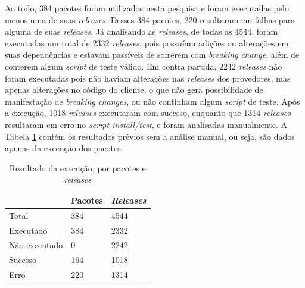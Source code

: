 
Ao todo, 384 pacotes foram utilizados nesta pesquisa e foram executadas pelo menos uma de suas \textit{releases}. Desses 384 pacotes, 220 resultaram em falhas para alguma de suas \textit{releases}. Já analisando as \textit{releases}, de todas as 4544, foram executadas um total de 2332 \textit{releases}, pois possuíam adições ou alterações em suas dependências e estavam passíveis de sofrerem com \textit{breaking change}, além de conterem algum \textit{script} de teste válido. Em contra partida, 2242 \textit{releases} não foram executadas pois não haviam alterações nas \textit{releases} dos provedores, mas apenas alterações no código do cliente, o que não gera possibilidade de manifestação de \textit{breaking changes}, ou não continham algum \textit{script} de teste. Após a execução, 1018 \textit{releases} executaram com sucesso, enquanto que 1314 \textit{releases} resultaram em erro no \textit{script install/test}, e foram analisadas manualmente. A Tabela \ref{tab:res_rq1_1} contém os resultados prévios sem a análise manual, ou seja, são dados apenas da execução dos pacotes.

\begin{table}[]
\centering
\begin{tabular}{|l|l|l|}
\hline
                    & Pacotes & \textit{Releases} \\ \hline
    Total           & 384     & 4544     \\
    Executado       & 384     & 2332     \\
    Não executado   & 0       & 2242     \\
    Sucesso         & 164     & 1018     \\
    Erro            & 220     & 1314     \\ \hline
\end{tabular}
\caption{Resultado da execução, por pacotes e \textit{releases}}
\label{tab:res_rq1_1}
\end{table}

